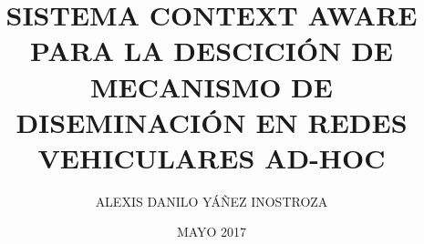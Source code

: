 \documentclass[upright, contnum]{umemoria}
\author{ALEXIS DANILO YÁÑEZ INOSTROZA}
\title{SISTEMA CONTEXT AWARE PARA LA DESCICIÓN DE MECANISMO DE DISEMINACIÓN EN REDES VEHICULARES AD-HOC}
\date{MAYO 2017}
\begin{document}
\frontmatter
\maketitle

\begin{abstract}
{\lipsum[1-4]}
\end{abstract}




\tableofcontents
\listoftables %
\listoffigures %

\mainmatter





%


\nocite{*}



\end{document}
